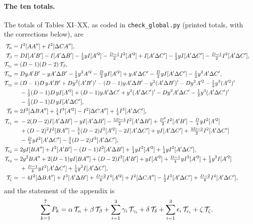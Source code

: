 \paragraph{The ten totals.} The totals of Tables XI--XX, as coded in \texttt{check\_global.py} (printed totals, with the corrections below), are
\begin{align}
\mathcal{T}_\alpha={}&I^2[AA'']+I^2[\Delta C A''],\nonumber\\
\mathcal{T}_\beta={}&DI[A'B']-I[A'\Delta B']-\tfrac12yI[A'^2]-\tfrac{D-1}{2}I^2[A'^2]+I[A'\Delta C']-\tfrac12yI[A'\Delta C']-\tfrac{D-1}{2}I^2[A'\Delta C'],\nonumber\\
\mathcal{T}_{\gamma_1}={}&(D-1)(D-2)\,\mathcal{T}_\beta,\nonumber\\
\mathcal{T}_{\gamma_2}={}&DyA'B'-yA'\Delta B'-\tfrac12y^2A'^2-\tfrac D2yI[A'^2]+yA'\Delta C'-\tfrac D2yI[A'\Delta C']-\tfrac12y^2A'\Delta C',\nonumber\\
\mathcal{T}_{\gamma_3}={}&(D-1)D\,yA'B'+Dy^2(A'B')'-(D-1)yA'\Delta B'-y^2(A'\Delta B')'-Dy^2A'^2-\tfrac12y^3(A'^2)'\nonumber\\
&-\tfrac12(D-1)D\,yI[A'^2]+(D-1)yA'\Delta C'+y^2(A'\Delta C')'-Dy^2A'\Delta C'-\tfrac12y^3(A'\Delta C')'\nonumber\\
&-\tfrac12(D-1)D\,yI[A'\Delta C'],\nonumber\\
\mathcal{T}_\delta={}&2I^2[\Delta BA'']+\tfrac14I^3[A'^2]-I^2[\Delta CA'']+\tfrac14I^3[A'\Delta C'],\label{ch6:totals}\\
\mathcal{T}_{\epsilon_1}={}&-2(D-2)I[A'\Delta B']-yI[A'\Delta B']-\tfrac{5D-4}{2}I^2[A'\Delta B']+\tfrac{D^2}{2}I^2[A'B']-\tfrac D4yI^2[A'^2]\nonumber\\
&+(D-2)^2I^2[BA'']-\tfrac34(D-2)I^3[A'^2]-2I[A'\Delta C']+yI[A'\Delta C']+\tfrac{3D-2}{2}I^2[A'\Delta C']\nonumber\\
&-\tfrac D4yI^2[A'\Delta C']-\tfrac34(D-2)I^3[A'\Delta C'],\nonumber\\
\mathcal{T}_{\epsilon_2}={}&2yI[BA'']+I^2[A'B']-(D-1)I^2[A'\Delta B']+\tfrac14yI^2[A'^2]+\tfrac14yI^2[A'\Delta C'],\nonumber\\
\mathcal{T}_{\epsilon_3}={}&2y^2BA''+2(D-1)yI[BA'']+(D-2)I^2[A'B']+yI[A'^2]+\tfrac{D-1}{4}yI^2[A'^2]+\tfrac14y^2I[A'^2]\nonumber\\
&+\tfrac{D-1}{4}yI^2[A'\Delta C']+\tfrac14y^2I[A'\Delta C'],\nonumber\\
\mathcal{T}_\zeta={}&-4I^2[\Delta BA'']+I^3[A'\Delta B']+\tfrac{D-2}{8}I^4[A'^2]+I^2[\Delta CA'']-\tfrac12I^3[A'\Delta C']+\tfrac{D-2}{8}I^4[A'\Delta C'],\nonumber
\end{align}
and the statement of the appendix is
\begin{equation}
\sum_{k=1}^7P_k=\alpha\,\mathcal{T}_\alpha+\beta\,\mathcal{T}_\beta+\sum_{i=1}^3\gamma_i\,\mathcal{T}_{\gamma_i}+\delta\,\mathcal{T}_\delta+\sum_{i=1}^3\epsilon_i\,\mathcal{T}_{\epsilon_i}+\zeta\,\mathcal{T}_\zeta .
\label{ch6:decomp}
\end{equation}

